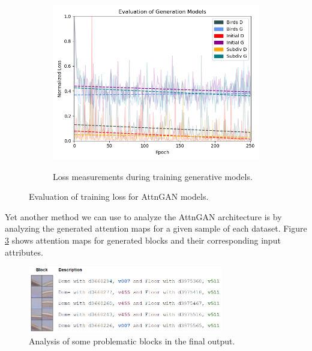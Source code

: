 \documentclass[letterpaper]{article} %
\begin{document}
\begin{figure}[h!]
\begin{subfigure}{0.5\textwidth}
\begin{center}
\begin{minipage}[t]{0.95\linewidth}
\begin{centering}
{\includegraphics[width=\linewidth]{eval_gentrain.png}}
\caption{Loss measurements during training generative models.}
\label{fig:eval_gentrain}
\end{centering}
\end{minipage}
\end{center}
\end{subfigure}
\caption{Evaluation of training loss for AttnGAN models.}
\label{fig:loss}
\end{figure}

Yet another method we can use to analyze the AttnGAN architecture is by 
analyzing the generated attention maps for a given sample of each dataset. 
Figure \ref{fig:final_comp} shows attention maps for generated blocks and their 
corresponding input attributes.

\begin{figure}[htbp]
\centerline{\includegraphics[width=8.5cm]{final_comp.png}}
\caption{Analysis of some problematic blocks in the final output.}
\label{fig:final_comp}
\end{figure}
\end{document}

